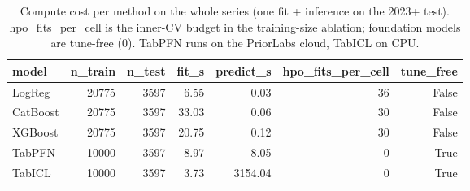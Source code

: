 \begin{table}[t]
  \centering
  \caption{Compute cost per method on the whole series (one fit + inference on the 2023+ test). hpo\_fits\_per\_cell is the inner-CV budget in the training-size ablation; foundation models are tune-free (0). TabPFN runs on the PriorLabs cloud, TabICL on CPU.}
  \label{tab:rev_cost}
  \begin{tabular}{lrrrrrr}
  \toprule
  model & n\_train & n\_test & fit\_s & predict\_s & hpo\_fits\_per\_cell & tune\_free \\
  \midrule
  LogReg & 20775 & 3597 & 6.55 & 0.03 & 36 & False \\
  CatBoost & 20775 & 3597 & 33.03 & 0.06 & 30 & False \\
  XGBoost & 20775 & 3597 & 20.75 & 0.12 & 30 & False \\
  TabPFN & 10000 & 3597 & 8.97 & 8.05 & 0 & True \\
  TabICL & 10000 & 3597 & 3.73 & 3154.04 & 0 & True \\
  \bottomrule
  \end{tabular}
\end{table}
